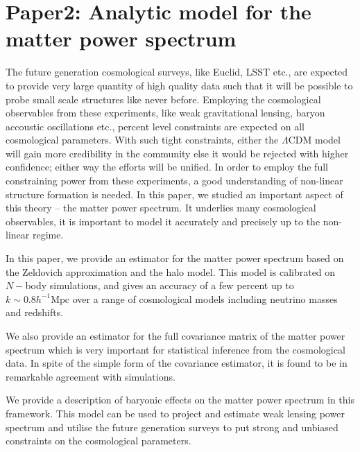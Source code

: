 \chapter{Paper2: Analytic model for the matter power spectrum}\label{paper:analyticmodel}

The future generation cosmological surveys, like Euclid, 
LSST etc., are expected to provide
very large quantity of high quality data such that it will be 
possible to probe small scale structures like never before. Employing 
the cosmological observables from these experiments,
like weak gravitational lensing, baryon accoustic oscillations etc., 
percent level constraints are expected on all cosmological 
parameters. With such tight
constraints, either the $\Lambda$CDM model will gain more credibility
in the community else it would be rejected with higher confidence; either 
way the efforts will be unified. 
In order to employ the full constraining power from these experiments, a good
understanding of non-linear structure formation is needed.
In this paper, we studied an important aspect of this theory -- 
the matter power spectrum. It underlies
many cosmological observables, it is important
to model it accurately and precisely up to the non-linear regime. 

In this paper, we provide an estimator for the matter
power spectrum based on the Zeldovich approximation and the halo model. 
This model is calibrated on $N-$body simulations, and gives
an accuracy of a few percent up to $k\sim 0.8 h^{-1}\mathrm{Mpc}$ 
over a range of cosmological models 
including neutrino masses and redshifts. 

We also provide an estimator for the full covariance matrix of the matter power
spectrum which is very important for statistical inference from the cosmological
data. In spite of the simple form of the covariance estimator, it is found
to be in remarkable agreement with simulations. 

We provide a description of baryonic effects on the matter
power spectrum in this framework. This model can be used to project and estimate
weak lensing power spectrum and utilise the future generation surveys
to put strong and unbiased constraints on the cosmological parameters.


\clearpage

